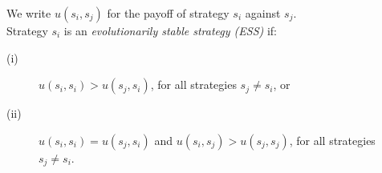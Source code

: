 \documentclass[preview, varwidth=18.5cm, border={0pt 5pt 0pt 1pt}]{standalone} %
\begin{document}




    We write \(u(s_i, s_j)\) for the payoff of strategy \(s_i\) against \(s_j\).\\

    Strategy \(s_i\) is an \emph{evolutionarily stable strategy (ESS)} if:
    \begin{description}
        \item[(i)] \(u(s_i, s_i) > u(s_j, s_i)\), for all strategies \(s_j \neq s_i\), or
        \item[(ii)] \(u(s_i, s_i) = u(s_j, s_i)\) and \(u(s_i, s_j) > u(s_j, s_j)\), for all strategies \(s_j \neq s_i\).
    \end{description}
\end{document}
